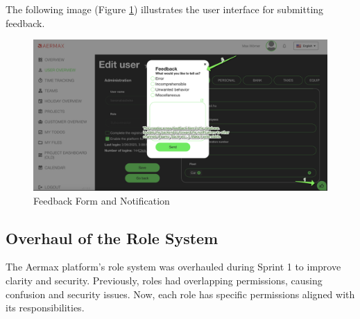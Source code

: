 The following image (Figure \ref{fig:feedback_form}) illustrates the user interface for submitting feedback.

\begin{figure}[H]
    \centering
    \includegraphics[width=1\textwidth]{src/assets/images/TeamsNotification.png}
    \caption{Feedback Form and Notification}
    \label{fig:feedback_form}
\end{figure}

\subsection{Overhaul of the Role System}
The Aermax platform's role system was overhauled during Sprint 1 to improve clarity and security. Previously, roles had overlapping permissions, causing confusion and security issues. Now, each role has specific permissions aligned with its responsibilities.

